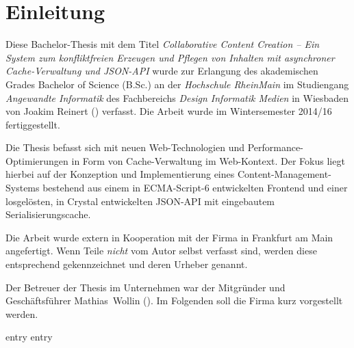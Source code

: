 \chapter{Einleitung}
\label{chap:einleitung}

Diese Bachelor-Thesis mit dem Titel \emph{Collaborative Content Creation -- Ein
System zum konfliktfreien Erzeugen und Pflegen von Inhalten mit asynchroner
Cache-Verwaltung und JSON-API} wurde zur Erlangung des akademischen Grades
Bachelor of Science (B.Sc.) an der \emph{Hochschule RheinMain} im Studiengang
\emph{Angewandte Informatik} des Fachbereichs \emph{Design Informatik Medien}
in Wiesbaden von Joakim Reinert () verfasst.  Die
Arbeit wurde im Wintersemester 2014/16 fertiggestellt.

Die Thesis befasst sich mit neuen Web-Technologien und
Performance-Optimierungen in Form von Cache-Verwaltung im Web-Kontext.  Der
Fokus liegt hierbei auf der Konzeption und Implementierung eines
Content-Management-Systems bestehend aus einem in ECMA-Script-6 entwickelten
Frontend und einer losgelösten, in Crystal entwickelten JSON-API mit
eingebautem Serialisierungscache.

Die Arbeit wurde extern in Kooperation mit der Firma \emph{\mesods} in
Frankfurt am Main angefertigt.  Wenn Teile \emph{nicht} vom Autor selbst
verfasst sind, werden diese entsprechend gekennzeichnet und deren Urheber
genannt.

Der Betreuer der Thesis im Unternehmen war der Mitgründer und Geschäftsführer
\mbox{Mathias Wollin} ().  Im Folgenden soll die Firma
kurz vorgestellt werden.

{entry}
{entry}

